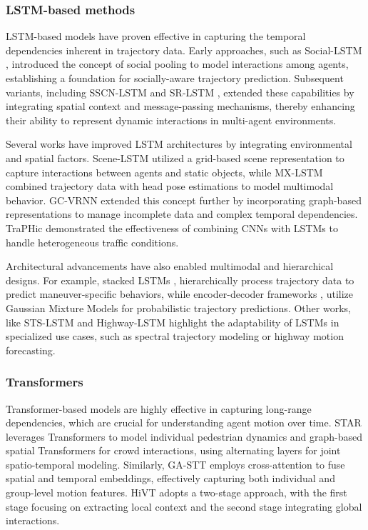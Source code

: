 \subsubsection{LSTM-based methods}

LSTM-based models have proven effective in capturing the temporal dependencies inherent in trajectory data. Early approaches, such as Social-LSTM \cite{7780479}, introduced the concept of social pooling to model interactions among agents, establishing a foundation for socially-aware trajectory prediction. Subsequent variants, including SSCN-LSTM \cite{Varshneya2017HumanTP} and SR-LSTM \cite{zhang2019srlstmstaterefinementlstm}, extended these capabilities by integrating spatial context and message-passing mechanisms, thereby enhancing their ability to represent dynamic interactions in multi-agent environments.

Several works have improved LSTM architectures by integrating environmental and spatial factors. Scene-LSTM \cite{Manh2018SceneLSTMAM} utilized a grid-based scene representation to capture interactions between agents and static objects, while MX-LSTM \cite{Hasan2018MXLSTMMT} combined trajectory data with head pose estimations to model multimodal behavior. GC-VRNN \cite{Xu2023UncoveringTM} extended this concept further by incorporating graph-based representations to manage incomplete data and complex temporal dependencies. TraPHic \cite{8954462} demonstrated the effectiveness of combining CNNs with LSTMs to handle heterogeneous traffic conditions.

Architectural advancements have also enabled multimodal and hierarchical designs. For example, stacked LSTMs \cite{10.1109/IVS.2018.8500493}, hierarchically process trajectory data to predict maneuver-specific behaviors, while encoder-decoder frameworks \cite{Zyner2018NaturalisticDI}, utilize Gaussian Mixture Models for probabilistic trajectory predictions. Other works, like STS-LSTM \cite{zhang_lstm_2023} and Highway-LSTM \cite{8317913} highlight the adaptability of LSTMs in specialized use cases, such as spectral trajectory modeling or highway motion forecasting.

\subsubsection{Transformers} Transformer-based models are highly effective in capturing long-range dependencies, which are crucial for understanding agent motion over time. STAR \cite{yu2020spatiotemporalgraphtransformernetworks} leverages Transformers to model individual pedestrian dynamics and graph-based spatial Transformers for crowd interactions, using alternating layers for joint spatio-temporal modeling. Similarly, GA-STT \cite{Zhou2022GASTTHT} employs cross-attention to fuse spatial and temporal embeddings, effectively capturing both individual and group-level motion features. HiVT \cite{9878832} adopts a two-stage approach, with the first stage focusing on extracting local context and the second stage integrating global interactions.

